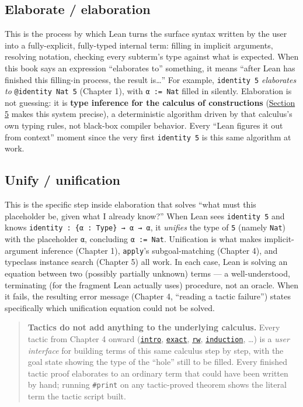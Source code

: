 \subsection{Elaborate / elaboration}\label{sec:01-basics:04-terminology:3}

This is the process by which Lean turns the surface syntax written by the user into a fully-explicit, fully-typed internal term: filling in implicit arguments, resolving notation, checking every subterm's type against what is expected. When this book says an expression ``elaborates to'' something, it means ``after Lean has finished this filling-in process, the result is\ldots{}'' For example, \texttt{identity 5} \emph{elaborates to} \texttt{@identity Nat 5} (Chapter 1), with \texttt{α := Nat} filled in silently. Elaboration is not guessing: it is \textbf{type inference for the calculus of constructions} (\hyperref[sec:01-basics:05-pi-sigma-and-coc:1]{Section 5} makes this system precise), a deterministic algorithm driven by that calculus's own typing rules, not black-box compiler behavior. Every ``Lean figures it out from context'' moment since the very first \texttt{identity 5} is this same algorithm at work.

\subsection{Unify / unification}\label{sec:01-basics:04-terminology:4}

This is the specific step inside elaboration that solves ``what must this placeholder be, given what I already know?'' When Lean sees \texttt{identity 5} and knows \texttt{identity : \{α : Type\} → α → α}, it \emph{unifies} the type of \texttt{5} (namely \texttt{Nat}) with the placeholder \texttt{α}, concluding \texttt{α := Nat}. Unification is what makes implicit-argument inference (Chapter 1), \texttt{apply}'s subgoal-matching (Chapter 4), and typeclass instance search (Chapter 5) all work. In each case, Lean is solving an equation between two (possibly partially unknown) terms --- a well-understood, terminating (for the fragment Lean actually uses) procedure, not an oracle. When it fails, the resulting error message (Chapter 4, ``reading a tactic failure'') states specifically which unification equation could not be solved.

\begin{quote}
\textbf{Tactics do not add anything to the underlying calculus.} Every tactic from Chapter 4 onward (\href{https://lean-lang.org/doc/reference/latest/Tactic-Proofs/Tactic-Reference/}{\texttt{intro}}, \href{https://lean-lang.org/doc/reference/latest/Tactic-Proofs/Tactic-Reference/}{\texttt{exact}}, \href{https://lean-lang.org/doc/reference/latest/Tactic-Proofs/Tactic-Reference/}{\texttt{rw}}, \href{https://lean-lang.org/doc/reference/latest/Tactic-Proofs/Tactic-Reference/}{\texttt{induction}}, \ldots) is a \emph{user interface} for building terms of this same calculus step by step, with the goal state showing the type of the ``hole'' still to be filled. Every finished tactic proof elaborates to an ordinary term that could have been written by hand; running \texttt{\#print} on any tactic-proved theorem shows the literal term the tactic script built.
\end{quote}

